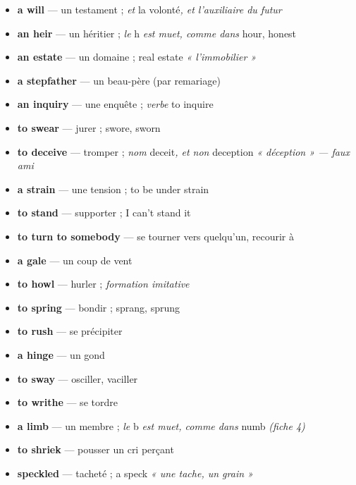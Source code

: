 \documentclass{fiche}
\begin{document}

\begin{itemize}[label=--,itemsep=0.8mm,leftmargin=*]\small
  \item \textbf{a will} — un testament ; \textit{et} la volonté\textit{, et l'auxiliaire du futur}
  \item \textbf{an heir} — un héritier ; \textit{le} h \textit{est muet, comme dans} hour, honest
  \item \textbf{an estate} — un domaine ; real estate \textit{« l'immobilier »}
  \item \textbf{a stepfather} — un beau-père (par remariage)
  \item \textbf{an inquiry} — une enquête ; \textit{verbe} to inquire
  \item \textbf{to swear} — jurer ; swore, sworn
  \item \textbf{to deceive} — tromper ; \textit{nom} deceit\textit{, et non} deception \textit{« déception » — faux ami}
  \item \textbf{a strain} — une tension ; to be under strain
  \item \textbf{to stand} — supporter ; I can't stand it
  \item \textbf{to turn to somebody} — se tourner vers quelqu'un, recourir à
  \item \textbf{a gale} — un coup de vent
  \item \textbf{to howl} — hurler ; \textit{formation imitative}
  \item \textbf{to spring} — bondir ; sprang, sprung
  \item \textbf{to rush} — se précipiter
  \item \textbf{a hinge} — un gond
  \item \textbf{to sway} — osciller, vaciller
  \item \textbf{to writhe} — se tordre
  \item \textbf{a limb} — un membre ; \textit{le} b \textit{est muet, comme dans} numb \textit{(fiche 4)}
  \item \textbf{to shriek} — pousser un cri perçant
  \item \textbf{speckled} — tacheté ; a speck \textit{« une tache, un grain »}
\end{itemize}
\end{document}
